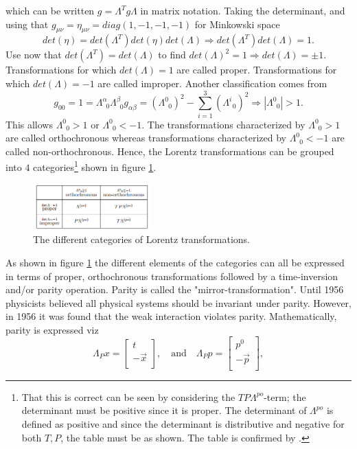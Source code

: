 which can be written $g=\Lambda^Tg\Lambda$ in matrix notation. Taking the determinant, and using that $g_{\mu\nu}=\eta_{\mu\nu}=diag(1,-1,-1,-1)$ for Minkowski space
\begin{equation}
	det(\eta)=det(\Lambda^T)det(\eta)det(\Lambda)\Rightarrow det(\Lambda^T)det(\Lambda)=1.
\end{equation} 
Use now that $det(\Lambda^T)=det(\Lambda)$ to find $det(\Lambda)^2=1\Rightarrow det(\Lambda)=\pm 1$. Transformations for which $det(\Lambda)= 1$ are called proper. Transformations for which $det(\Lambda)= -1$ are called improper. Another classification comes from
\begin{equation}
	g_{00}=1=\Lambda^\alpha_{\,\,\,0}\Lambda^\beta_{\,\,\,0}g_{\alpha\beta}=(\Lambda^0_{\,\,\,0})^2-\sum_{i=1}^{3}(\Lambda^i_{\,\,\,0})^2\Rightarrow |\Lambda^0_{\,\,\,0}|>1.
\end{equation} 
This allows $\Lambda^0_{\,\,\,0}>1$ or $\Lambda^0_{\,\,\,0}<-1$. The transformations characterized by $\Lambda^0_{\,\,\,0}>1$ are called orthochronous whereas transformations characterized by $\Lambda^0_{\,\,\,0}<-1$ are called non-orthochronous. Hence, the Lorentz transformations can be grouped into $4$ categories\footnote{That this is correct can be seen by considering the $TP\Lambda^{po}$-term; the determinant must be positive since it is proper. The determinant of $\Lambda^{po}$ is defined as positive and since the determinant is distributive and negative for both $T,P$, the table must be as shown. The table is confirmed by \citet{Srednicki2027}.} shown in figure \ref{fig:5}.
\begin{figure}[H]
	\captionsetup{width=1\textwidth}
	\centering
	\includegraphics[width=0.4\textwidth]{figures/5}
	\caption{The different categories of Lorentz transformations.}
	\label{fig:5}
\end{figure} 
As shown in figure \ref{fig:5} the different elements of the categories can all be expressed in terms of proper, orthochronous transformations followed by a time-inversion and/or parity operation. Parity is called the "mirror-transformation". Until 1956 physicists believed all physical systems should be invariant under parity. However, in 1956 it was found that the weak interaction violates parity. Mathematically, parity is expressed viz
\begin{equation}
	\Lambda_P x=\begin{bmatrix}
		t\\
		-\vec{x}\\
	\end{bmatrix}, \quad \text{and} \quad  \Lambda_Pp=\begin{bmatrix}
		p^0\\
		-\vec{p}\\
	\end{bmatrix},
\end{equation} 
